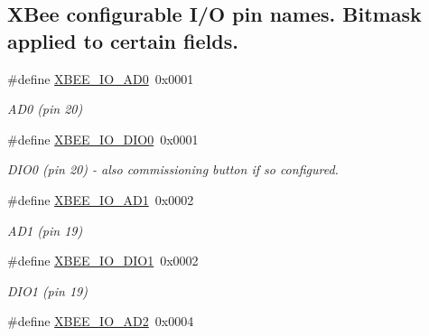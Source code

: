 \begin{DoxyCompactItemize}
\end{DoxyCompactItemize}
\subsection*{X\-Bee configurable I/\-O pin names. Bitmask applied to certain fields.}
\begin{DoxyCompactItemize}
\item 
\hypertarget{group__xbee__io_gafc56816e62b0dd0a8d981b08f5f29651}{\#define \hyperlink{group__xbee__io_gafc56816e62b0dd0a8d981b08f5f29651}{X\-B\-E\-E\-\_\-\-I\-O\-\_\-\-A\-D0}~0x0001}\label{group__xbee__io_gafc56816e62b0dd0a8d981b08f5f29651}

\begin{DoxyCompactList}\small\item\em A\-D0 (pin 20) \end{DoxyCompactList}\item 
\hypertarget{group__xbee__io_gaf01ab2d51afb8e360ade1ec5ceb15f0c}{\#define \hyperlink{group__xbee__io_gaf01ab2d51afb8e360ade1ec5ceb15f0c}{X\-B\-E\-E\-\_\-\-I\-O\-\_\-\-D\-I\-O0}~0x0001}\label{group__xbee__io_gaf01ab2d51afb8e360ade1ec5ceb15f0c}

\begin{DoxyCompactList}\small\item\em D\-I\-O0 (pin 20) -\/ also commissioning button if so configured. \end{DoxyCompactList}\item 
\hypertarget{group__xbee__io_ga78db08538e469fbe09b17180b74f3e1c}{\#define \hyperlink{group__xbee__io_ga78db08538e469fbe09b17180b74f3e1c}{X\-B\-E\-E\-\_\-\-I\-O\-\_\-\-A\-D1}~0x0002}\label{group__xbee__io_ga78db08538e469fbe09b17180b74f3e1c}

\begin{DoxyCompactList}\small\item\em A\-D1 (pin 19) \end{DoxyCompactList}\item 
\hypertarget{group__xbee__io_gaf13c9ac98667d02de7b5ab0428b20dc2}{\#define \hyperlink{group__xbee__io_gaf13c9ac98667d02de7b5ab0428b20dc2}{X\-B\-E\-E\-\_\-\-I\-O\-\_\-\-D\-I\-O1}~0x0002}\label{group__xbee__io_gaf13c9ac98667d02de7b5ab0428b20dc2}

\begin{DoxyCompactList}\small\item\em D\-I\-O1 (pin 19) \end{DoxyCompactList}\item 
\hypertarget{group__xbee__io_ga03c92ebb88533c632409a6d869b7d063}{\#define \hyperlink{group__xbee__io_ga03c92ebb88533c632409a6d869b7d063}{X\-B\-E\-E\-\_\-\-I\-O\-\_\-\-A\-D2}~0x0004}\label{group__xbee__io_ga03c92ebb88533c632409a6d869b7d063}


\end{DoxyCompactItemize}
